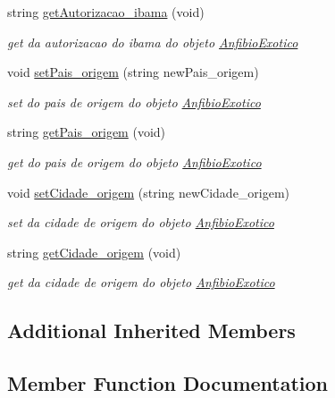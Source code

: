 \begin{DoxyCompactItemize}
string \mbox{\hyperlink{class_anfibio_exotico_a623f369c30f6fffdc9ce790af83ee757}{get\+Autorizacao\+\_\+ibama}} (void)
\begin{DoxyCompactList}\small\item\em get da autorizacao do ibama do objeto \mbox{\hyperlink{class_anfibio_exotico}{Anfibio\+Exotico}} \end{DoxyCompactList}\item 
void \mbox{\hyperlink{class_anfibio_exotico_a32f78e330f8f78df40ab147ac1e074b2}{set\+Pais\+\_\+origem}} (string new\+Pais\+\_\+origem)
\begin{DoxyCompactList}\small\item\em set do pais de origem do objeto \mbox{\hyperlink{class_anfibio_exotico}{Anfibio\+Exotico}} \end{DoxyCompactList}\item 
string \mbox{\hyperlink{class_anfibio_exotico_ad775d02fe9a051357e95f6d97ad234bf}{get\+Pais\+\_\+origem}} (void)
\begin{DoxyCompactList}\small\item\em get do pais de origem do objeto \mbox{\hyperlink{class_anfibio_exotico}{Anfibio\+Exotico}} \end{DoxyCompactList}\item 
void \mbox{\hyperlink{class_anfibio_exotico_a34c761351fcacbdd519d3c5ab047f974}{set\+Cidade\+\_\+origem}} (string new\+Cidade\+\_\+origem)
\begin{DoxyCompactList}\small\item\em set da cidade de origem do objeto \mbox{\hyperlink{class_anfibio_exotico}{Anfibio\+Exotico}} \end{DoxyCompactList}\item 
string \mbox{\hyperlink{class_anfibio_exotico_a283a954fe986d0cf350a32f4c85e5434}{get\+Cidade\+\_\+origem}} (void)
\begin{DoxyCompactList}\small\item\em get da cidade de origem do objeto \mbox{\hyperlink{class_anfibio_exotico}{Anfibio\+Exotico}} \end{DoxyCompactList}\end{DoxyCompactItemize}
\subsection*{Additional Inherited Members}


\subsection{Member Function Documentation}
\mbox{\label{class_anfibio_exotico_a623f369c30f6fffdc9ce790af83ee757}} 
